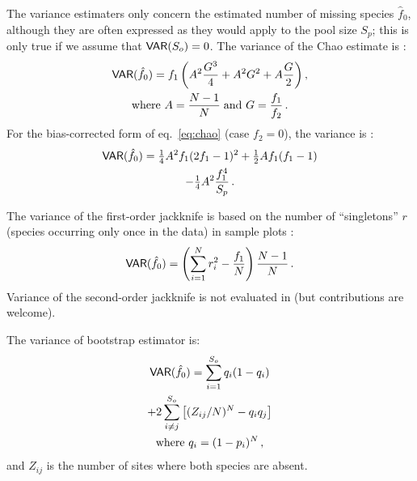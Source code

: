\documentclass[a4paper,10pt,twocolumn]{article}
\begin{document}
The variance estimaters only concern the estimated number of missing
species $\hat f_0$, although they are often expressed as they would
apply to the pool size $S_p$; this is only true if we assume that
$\mathsf{VAR}(S_o) = 0$.  The variance of the Chao estimate is \citep{ChiuEtal14}:
\begin{multline}
\label{eq:var-chao-basic}
\mathsf{VAR}(\hat f_0) = f_1 \left(A^2 \frac{G^3}{4} + A^2 G^2 + A \frac{G}{2} \right),\\
\text{where } A = \frac{N-1}{N}\;\text{and } G = \frac{f_1}{f_2} \,.
\end{multline}
For the bias-corrected form of eq.~\ref{eq:chao}  (case $f_2 = 0$), the variance is
\citep[who omit small-sample correction in some terms]{ChiuEtal14}:
\begin{multline}
\label{eq:var-chao-bc0}
\mathsf{VAR}(\hat f_0) = \tfrac{1}{4} A^2 f_1 (2f_1 -1)^2 + \tfrac{1}{2} A f_1
(f_1-1) \\- \tfrac{1}{4}A^2 \frac{f_1^4}{S_p} \,.
\end{multline}

The variance of the first-order jackknife is based on the number of
``singletons'' $r$ (species occurring only once in the data) in sample
plots \citep{SmithVanBelle84}:
\begin{equation}
\mathsf{VAR}(\hat f_0) = \left(\sum_{i=1}^N r_i^2 - \frac{f_1}{N}\right)
\frac{N-1}{N} \,.
\end{equation}
Variance of the second-order jackknife is not evaluated in
 (but contributions are welcome).

The variance of bootstrap estimator is\citep{SmithVanBelle84}:
\begin{multline}
\mathsf{VAR}(\hat f_0) = \sum_{i=1}^{S_o} q_i (1-q_i)  \\ +2 \sum_{i \neq
  j}^{S_o} \left[(Z_{ij}/N)^N - q_i q_j \right] \\
\text{where } q_i = (1-p_i)^N \, ,
\end{multline}
and $Z_{ij}$ is the number of sites where both species are absent.
\end{document}
